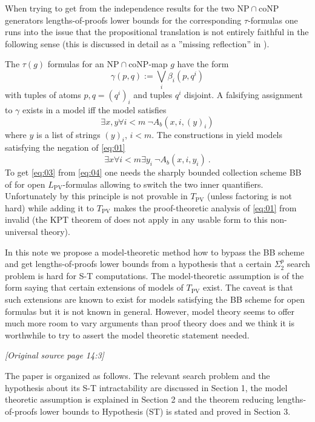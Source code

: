 \documentclass[11pt]{article}
\newcommand{\LPV}{L_{\mathrm{PV}}}
\newcommand{\TPV}{T_{\mathrm{PV}}}
\newcommand{\NP}{\mathrm{NP}}
\newcommand{\coNP}{\mathrm{coNP}}
\newcommand{\sourcepage}[1]{\par\Needspace{5\baselineskip}\bigskip\noindent\textit{[Original source page 14:#1]}\par\medskip}
\begin{document}
When trying to get from the independence results for the two $\NP\cap\coNP$ generators lengths-of-proofs lower bounds for the corresponding $\tau$-formulas one runs into the issue that the propositional translation is not entirely faithful in the following sense (this is discussed in detail as a ”missing reflection” in \cite{Kra11}).

The $\tau(g)$ formulas for an $\NP\cap\coNP$-map $g$ have the form
\begin{equation}
\gamma(p,q):=\bigvee_i\beta_i(p,q^i)
\tag{0.2}\label{eq:02}
\end{equation}
with tuples of atoms $p,q=(q^i)_i$ and tuples $q^i$ disjoint. A falsifying assignment to $\gamma$ exists in a model iff the model satisfies
\begin{equation}
\exists x,y\forall i<m\ \neg A_b(x,i,(y)_i)
\tag{0.3}\label{eq:03}
\end{equation}
where $y$ is a list of strings $(y)_i$, $i<m$. The constructions in \cite{Kra11,Kra25} yield models satisfying the negation of \eqref{eq:01}
\begin{equation}
\exists x\forall i<m\exists y_i\ \neg A_b(x,i,y_i)\ .
\tag{0.4}\label{eq:04}
\end{equation}
To get \eqref{eq:03} from \eqref{eq:04} one needs the sharply bounded collection scheme BB of \cite{Bus86} for open $\LPV$-formulas allowing to switch the two inner quantifiers. Unfortunately by \cite{CT06} this principle is not provable in $\TPV$ (unless factoring is not hard) while adding it to $\TPV$ makes the proof-theoretic analysis of \eqref{eq:01} from \cite{Kra11,Kra25} invalid (the KPT theorem of \cite{KPT91} does not apply in any usable form to this non-universal theory).

In this note we propose a model-theoretic method how to bypass the BB scheme and get lengths-of-proofs lower bounds from a hypothesis that a certain $\Sigma^p_2$ search problem is hard for S-T computations. The model-theoretic assumption is of the form saying that certain extensions of models of $\TPV$ exist. The caveat is that such extensions are known to exist for models satisfying the BB scheme for open formulas but it is not known in general. However, model theory seems to offer much more room to vary arguments than proof theory does and we think it is worthwhile to try to assert the model theoretic statement needed.

\sourcepage{3}
The paper is organized as follows. The relevant search problem and the hypothesis about its S-T intractability are discussed in Section 1, the model theoretic assumption is explained in Section 2 and the theorem reducing lengths-of-proofs lower bounds to Hypothesis (ST) is stated and proved in Section 3.
\end{document}
